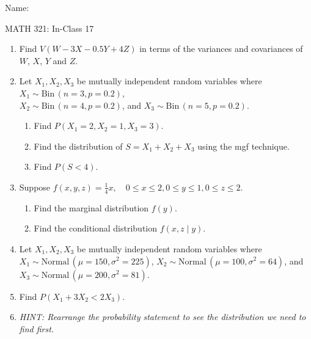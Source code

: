 \documentclass{article}
\newcommand{\follow}[1]{\sim \text{#1}\,}		%
\begin{document}
\hspace{375pt}Name:

\begin{center}
{\Huge MATH 321: In-Class 17}
\end{center}

\bigskip\bigskip



\begin{enumerate}
    \item Find $V(W - 3X - 0.5Y + 4Z)$ in terms of the variances and covariances of $W$, $X$, $Y$ and $Z$.\vspace{100pt}%
    
    \item Let $X_1, X_2, X_3$ be mutually independent random variables where $X_1 \follow{Bin}(n = 3, p = 0.2)$, \\$X_2 \follow{Bin}(n = 4, p = 0.2)$, and $X_3 \follow{Bin}(n = 5, p = 0.2)$.\bigskip%
    \begin{enumerate}
        \item Find $P(X_1 = 2, X_2 = 1, X_3 = 3)$.\vspace{100pt}
        \item Find the distribution of $S = X_1 + X_2 + X_3$ using the mgf technique.\vspace{100pt}%
        \item Find $P(S < 4)$.\vspace{50pt}
    \end{enumerate}\newpage
    
    \item Suppose $f(x, y, z) = \frac{1}{4}x, \quad 0 \le x \le 2, 0 \le y \le 1, 0 \le z \le 2$.\bigskip%
    \begin{enumerate}
        \item Find the marginal distribution $f(y)$.\vspace{130pt}
        \item Find the conditional distribution $f(x,z \mid y)$.\vspace{130pt}
    \end{enumerate}
    
    \item Let $X_1, X_2, X_3$ be mutually independent random variables where $X_1 \follow{Normal}(\mu = 150, \sigma^2 = 225)$, $X_2 \follow{Normal}(\mu = 100, \sigma^2 = 64)$, and $X_3 \follow{Normal}(\mu = 200, \sigma^2 = 81)$.%
    \item[] Find $P(X_1 + 3X_2 < 2X_3)$.
    \item[] \textit{HINT: Rearrange the probability statement to see the distribution we need to find first.}
\end{enumerate}


    
\end{document}

